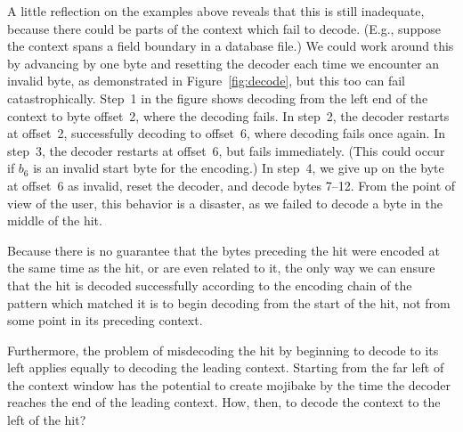 \documentclass[5p,final,number,sort&compress]{elsarticle}
\begin{document}
A little reflection on the examples above reveals that this is still inadequate, because there could be parts of the context which fail to decode. (E.g., suppose the context spans a field boundary in a database file.) We could work around this by advancing by one byte and resetting the decoder each time we encounter an invalid byte, as demonstrated in Figure~\ref{fig:decode}, but this too can fail catastrophically. Step~1 in the figure shows decoding from the left end of the context to byte offset~2, where the decoding fails. In step~2, the decoder restarts at offset~2, successfully decoding to offset~6, where decoding fails once again. In step~3, the decoder restarts at offset~6, but fails immediately. (This could occur if $b_6$ is an invalid start byte for the encoding.) In step~4, we give up on the byte at offset~6 as invalid, reset the decoder, and decode bytes 7--12. From the point of view of the user, this behavior is a disaster, as we failed to decode a byte in the middle of the hit.

Because there is no guarantee that the bytes preceding the hit were encoded at the same time as the hit, or are even related to it, the only way we can ensure that the hit is decoded successfully according to the encoding chain of the pattern which matched it is to begin decoding from the start of the hit, not from some point in its preceding context.

Furthermore, the problem of misdecoding the hit by beginning to decode to its left applies equally to decoding the leading context. Starting from the far left of the context window has the potential to create mojibake by the time the decoder reaches the end of the leading context. How, then, to decode the context to the left of the hit?
\end{document}
